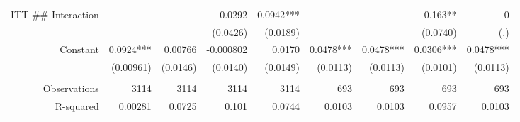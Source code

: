 \begin{tabular}{rrrrrrrrr}
ITT \#\# Interaction &       &       & 0.0292 & 0.0942*** &       &       & 0.163** & 0 \\
      &       &       & (0.0426) & (0.0189) &       &       & (0.0740) & (.) \\
Constant & 0.0924*** & 0.00766 & -0.000802 & 0.0170 & 0.0478*** & 0.0478*** & 0.0306*** & 0.0478*** \\
      & (0.00961) & (0.0146) & (0.0140) & (0.0149) & (0.0113) & (0.0113) & (0.0101) & (0.0113) \\
      &       &       &       &       &       &       &       &  \\
      \midrule
Observations & 3114  & 3114  & 3114  & 3114  & 693   & 693   & 693   & 693 \\
R-squared & 0.00281 & 0.0725 & 0.101 & 0.0744 & 0.0103 & 0.0103 & 0.0957 & 0.0103 \\
\bottomrule
\end{tabular}%
